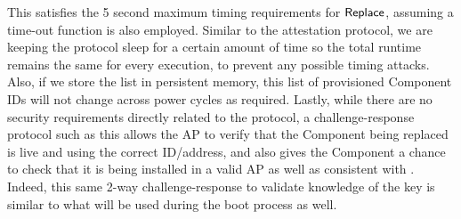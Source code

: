 
This satisfies the 5 second maximum timing requirements for $\mathsf{Replace}$, assuming a time-out function is also employed. Similar to the attestation protocol, we are keeping the protocol sleep for a certain amount of time so the total runtime remains the same for every execution, to prevent any possible timing attacks. Also, if we store the \provcid list in persistent memory, this list of provisioned Component IDs will not change across power cycles as required. Lastly, while there are no security requirements directly related to the \replace protocol, a challenge-response protocol such as this allows the AP to verify that the Component being replaced is live and using the correct ID/address, and also  gives the Component a chance to check that it is being installed in a valid AP as well as consistent with \cite{eCTFOfficial}. Indeed, this same 2-way challenge-response to validate knowledge of the key \sk is similar to what will be used during the boot process as well. 
